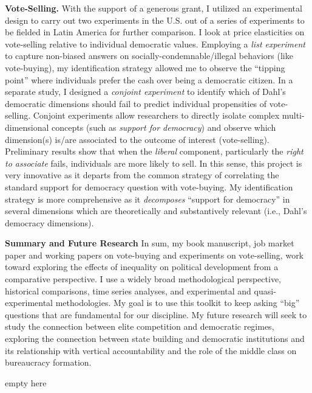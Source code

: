 \documentclass[11pt]{letter} %
\begin{document}
\begin{letter}{}
{\bf Vote-Selling.} With the support of a generous grant, I utilized an experimental design to carry out two experiments in the U.S. out of a series of experiments to be fielded in Latin America for further comparison. I look at price elasticities on vote-selling relative to individual democratic values. Employing a \emph{list experiment} to capture non-biased answers on socially-condemnable/illegal behaviors (like vote-buying), my identification strategy allowed me to observe the ``tipping point'' where individuals prefer the cash over being a democratic citizen. In a separate study, I designed a \emph{conjoint experiment} to identify which of Dahl's democratic dimensions should fail to predict individual propensities of vote-selling. Conjoint experiments allow researchers to directly isolate complex multi-dimensional concepts (such as \emph{support for democracy}) and observe which dimension(s) is/are associated to the outcome of interest (vote-selling). Preliminary results show that when the \emph{liberal} component, particularly the \emph{right to associate} fails, individuals are more likely to sell. In this sense, this project is very innovative as it departs from the common strategy of correlating the standard support for democracy question with vote-buying. My identification strategy is more comprehensive as it \emph{decomposes} ``support for democracy'' in several dimensions which are theoretically and substantively relevant (i.e., Dahl's democracy dimensions). 


{\bf Summary and Future Research} In sum, my book manuscript, job market paper and working papers on vote-buying and experiments on vote-selling, work toward exploring the effects of inequality on political development from a comparative perspective. I use a widely broad methodological perspective, historical comparisons, time series analyses, and experimental and quasi-experimental methodologies. My goal is to use this toolkit to keep asking ``big'' questions that are fundamental for our discipline. My future research will seek to study the connection between elite competition and democratic regimes, exploring the connection between state building and democratic institutions and its relationship with vertical accountability and the role of the middle class on bureaucracy formation.

\closing{{\color{white}empty here}}




\end{letter}
\end{document}

